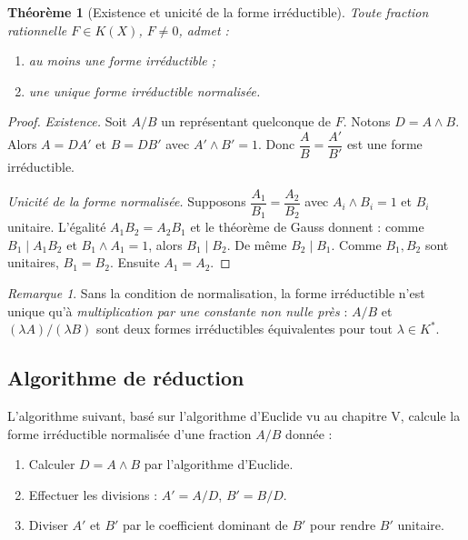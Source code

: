 \documentclass[12pt,a4paper]{report}
\newtheorem{theoreme}{Théorème}[section]
\theoremstyle{definition}
\theoremstyle{remark}
\newtheorem{remarque}{Remarque}[section]
\begin{document}
\begin{theoreme}[Existence et unicité de la forme irréductible]
Toute fraction rationnelle $F \in K(X)$, $F \neq 0$, admet :
\begin{enumerate}
    \item au moins une forme irréductible ;
    \item une unique forme irréductible \emph{normalisée}.
\end{enumerate}
\end{theoreme}

\begin{proof}
\emph{Existence.} Soit $A/B$ un représentant quelconque de $F$. Notons $D = A \wedge B$. Alors $A = D A'$ et $B = D B'$ avec $A' \wedge B' = 1$. Donc $\dfrac{A}{B} = \dfrac{A'}{B'}$ est une forme irréductible.

\emph{Unicité de la forme normalisée.} Supposons $\dfrac{A_1}{B_1} = \dfrac{A_2}{B_2}$ avec $A_i \wedge B_i = 1$ et $B_i$ unitaire. L'égalité $A_1 B_2 = A_2 B_1$ et le théorème de Gauss donnent : comme $B_1 \mid A_1 B_2$ et $B_1 \wedge A_1 = 1$, alors $B_1 \mid B_2$. De même $B_2 \mid B_1$. Comme $B_1, B_2$ sont unitaires, $B_1 = B_2$. Ensuite $A_1 = A_2$.
\end{proof}

\begin{remarque}
Sans la condition de normalisation, la forme irréductible n'est unique qu'à \emph{multiplication par une constante non nulle près} : $A/B$ et $(\lambda A)/(\lambda B)$ sont deux formes irréductibles équivalentes pour tout $\lambda \in K^*$.
\end{remarque}

\subsection{Algorithme de réduction}

L'algorithme suivant, basé sur l'algorithme d'Euclide vu au chapitre V, calcule la forme irréductible normalisée d'une fraction $A/B$ donnée :

\begin{enumerate}
    \item Calculer $D = A \wedge B$ par l'algorithme d'Euclide.
    \item Effectuer les divisions : $A' = A / D$, $B' = B / D$.
    \item Diviser $A'$ et $B'$ par le coefficient dominant de $B'$ pour rendre $B'$ unitaire.
\end{enumerate}
\end{document}
